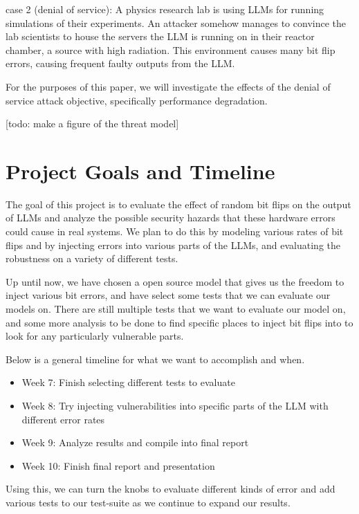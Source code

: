 \documentclass[a4paper]{article}
\begin{document}
case 2 (denial of service): A physics research lab is using LLMs for running simulations of their experiments. An attacker somehow manages to convince the lab scientists to house the servers the LLM is running on in their reactor chamber, a source with high radiation. This environment causes many bit flip errors, causing frequent faulty outputs from the LLM.

For the purposes of this paper, we will investigate the effects of the denial of service attack objective, specifically performance degradation.


[todo: make a figure of the threat model]

\section{Project Goals and Timeline}

The goal of this project is to evaluate the effect of random bit flips on the output of LLMs and analyze the possible security hazards that these hardware errors could cause in real systems. We plan to do this by modeling various rates of bit flips and by injecting errors into various parts of the LLMs, and evaluating the robustness on a variety of different tests.

Up until now, we have chosen a open source model that gives us the freedom to inject various bit errors, and have select some tests that we can evaluate our models on. There are still multiple tests that we want to evaluate our model on, and some more analysis to be done to find specific places to inject bit flips into to look for any particularly vulnerable parts.

Below is a general timeline for what we want to accomplish and when.

\begin{itemize}
	\item Week 7: Finish selecting different tests to evaluate
	\item Week 8: Try injecting vulnerabilities into specific parts of the LLM with different error rates
	\item Week 9: Analyze results and compile into final report
	\item  Week 10: Finish final report and presentation
\end{itemize}

Using this, we can turn the knobs to evaluate different kinds of error and add various tests to our test-suite as we continue to expand our results.
\end{document}
